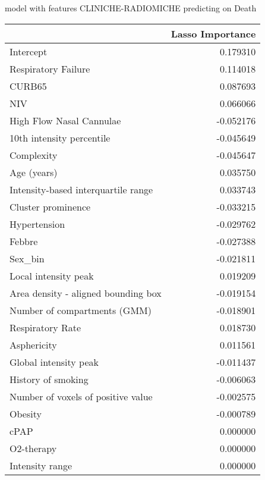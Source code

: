 model with features CLINICHE-RADIOMICHE predicting on Death\newline
\begin{tabular}{lr}
\toprule
{} &  Lasso Importance \\
\midrule
Intercept                           &          0.179310 \\
Respiratory Failure                 &          0.114018 \\
CURB65                              &          0.087693 \\
NIV                                 &          0.066066 \\
High Flow Nasal Cannulae            &         -0.052176 \\
10th intensity percentile           &         -0.045649 \\
Complexity                          &         -0.045647 \\
Age (years)                         &          0.035750 \\
Intensity-based interquartile range &          0.033743 \\
Cluster prominence                  &         -0.033215 \\
Hypertension                        &         -0.029762 \\
Febbre                              &         -0.027388 \\
Sex\_bin                             &         -0.021811 \\
Local intensity peak                &          0.019209 \\
Area density - aligned bounding box &         -0.019154 \\
Number of compartments (GMM)        &         -0.018901 \\
Respiratory Rate                    &          0.018730 \\
Asphericity                         &          0.011561 \\
Global intensity peak               &         -0.011437 \\
History of smoking                  &         -0.006063 \\
Number of voxels of positive value  &         -0.002575 \\
Obesity                             &         -0.000789 \\
cPAP                                &          0.000000 \\
O2-therapy                          &          0.000000 \\
Intensity range                     &          0.000000 \\
\bottomrule
\end{tabular}


